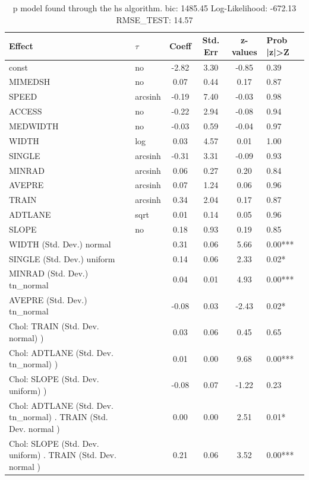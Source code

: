\begin{table}
	\caption{p model found through the hs algorithm. bic: 1485.45 Log-Likelihood: -672.13 RMSE_TEST: 14.57}
	\begin{center}
		\begin{tabular}{|l|l|c|c|c|l|}
			\hline
			Effect & $\tau$ & Coeff & Std. Err & z-values & Prob |z|>Z \\
			\hline
			const & no & -2.82 & 3.30 & -0.85 & 0.39 \\
			\hline
			MIMEDSH & no & 0.07 & 0.44 & 0.17 & 0.87 \\
			\hline
			SPEED & arcsinh & -0.19 & 7.40 & -0.03 & 0.98 \\
			\hline
			ACCESS & no & -0.22 & 2.94 & -0.08 & 0.94 \\
			\hline
			MEDWIDTH & no & -0.03 & 0.59 & -0.04 & 0.97 \\
			\hline
			WIDTH & log & 0.03 & 4.57 & 0.01 & 1.00 \\
			\hline
			SINGLE & arcsinh & -0.31 & 3.31 & -0.09 & 0.93 \\
			\hline
			MINRAD & arcsinh & 0.06 & 0.27 & 0.20 & 0.84 \\
			\hline
			AVEPRE & arcsinh & 0.07 & 1.24 & 0.06 & 0.96 \\
			\hline
			TRAIN & arcsinh & 0.34 & 2.04 & 0.17 & 0.87 \\
			\hline
			ADTLANE & sqrt & 0.01 & 0.14 & 0.05 & 0.96 \\
			\hline
			SLOPE & no & 0.18 & 0.93 & 0.19 & 0.85 \\
			\hline
			WIDTH (Std. Dev.) normal &  & 0.31 & 0.06 & 5.66 & 0.00*** \\
			\hline
			SINGLE (Std. Dev.) uniform &  & 0.14 & 0.06 & 2.33 & 0.02* \\
			\hline
			MINRAD (Std. Dev.) tn_normal &  & 0.04 & 0.01 & 4.93 & 0.00*** \\
			\hline
			AVEPRE (Std. Dev.) tn_normal &  & -0.08 & 0.03 & -2.43 & 0.02* \\
			\hline
			 Chol: TRAIN (Std. Dev. normal) ) &  & 0.03 & 0.06 & 0.45 & 0.65 \\
			\hline
			 Chol: ADTLANE (Std. Dev. tn_normal) ) &  & 0.01 & 0.00 & 9.68 & 0.00*** \\
			\hline
			 Chol: SLOPE (Std. Dev. uniform) ) &  & -0.08 & 0.07 & -1.22 & 0.23 \\
			\hline
			 Chol: ADTLANE (Std. Dev. tn_normal) . TRAIN (Std. Dev.   normal ) &  & 0.00 & 0.00 & 2.51 & 0.01* \\
			\hline
			 Chol: SLOPE (Std. Dev. uniform) . TRAIN (Std. Dev.   normal ) &  & 0.21 & 0.06 & 3.52 & 0.00*** \\

\end{tabular}
\end{center}
\end{table}
